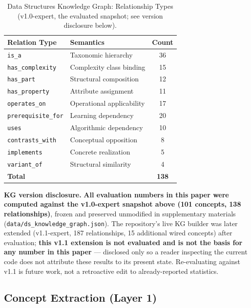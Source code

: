 \documentclass[conference]{IEEEtran}
\begin{document}
\begin{table}[t]
\caption{Data Structures Knowledge Graph: Relationship Types (v1.0-expert,
the evaluated snapshot; see version disclosure below).}
\label{tab:kg_rels}
\centering
\begin{tabular}{llc}
\toprule
\textbf{Relation Type} & \textbf{Semantics} & \textbf{Count} \\
\midrule
\texttt{is\_a}             & Taxonomic hierarchy           & 36 \\
\texttt{has\_complexity}   & Complexity class binding      & 15 \\
\texttt{has\_part}         & Structural composition        & 12 \\
\texttt{has\_property}     & Attribute assignment          & 11 \\
\texttt{operates\_on}      & Operational applicability     & 17 \\
\texttt{prerequisite\_for} & Learning dependency           & 20 \\
\texttt{uses}              & Algorithmic dependency        & 10 \\
\texttt{contrasts\_with}   & Conceptual opposition         &  8 \\
\texttt{implements}        & Concrete realization          &  5 \\
\texttt{variant\_of}       & Structural similarity         &  4 \\
\midrule
\textbf{Total} & & \textbf{138} \\
\bottomrule
\end{tabular}
\end{table}

\textbf{KG version disclosure.} \textbf{All evaluation numbers in this
paper were computed against the v1.0-expert snapshot above (101
concepts, 138 relationships)}, frozen and preserved unmodified in
supplementary materials (\texttt{data/ds\_knowledge\_graph.json}). The
repository's live KG builder was later extended (v1.1-expert, 187
relationships, 15 additional wired concepts) after evaluation;
\textbf{this v1.1 extension is not evaluated and is not the basis for
any number in this paper} --- disclosed only so a reader inspecting
the current code does not attribute these results to its present
state. Re-evaluating against v1.1 is future work, not a retroactive
edit to already-reported statistics.

\subsection{Concept Extraction (Layer 1)}
\label{subsec:extraction}
\end{document}

